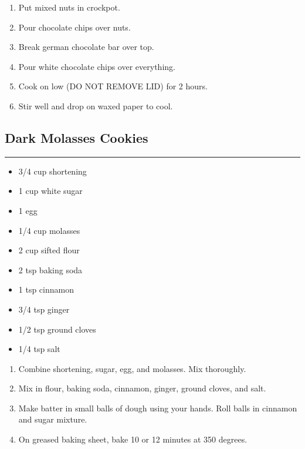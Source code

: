 \documentclass{article}
\begin{document}
\begin{enumerate}
    \item 
        Put mixed nuts in crockpot. 
    \item 
        Pour chocolate chips over nuts.
    \item 
        Break german chocolate bar over top.
    \item 
        Pour white chocolate chips over everything.
    \item 
        Cook on low (DO NOT REMOVE LID) for 2 hours.
    \item 
        Stir well and drop on waxed paper to cool.
\end{enumerate}
\newpage

\subsection{Dark Molasses Cookies} 
\noindent\rule[0.5ex]{\linewidth}{1pt}

\begin{framed}
    \begin{itemize}
        \item 3/4 cup shortening
        \item 1 cup white sugar
        \item 1 egg
        \item 1/4 cup molasses
        \item 2 cup sifted flour
        \item 2 tsp baking soda
        \item 1 tsp cinnamon
        \item 3/4 tsp ginger
        \item 1/2 tsp ground cloves
        \item 1/4 tsp salt
    \end{itemize}
\end{framed}

\begin{enumerate}
    \item 
        Combine shortening, sugar, egg, and molasses. Mix thoroughly.
    \item 
        Mix in flour, baking soda, cinnamon, ginger, ground cloves, and salt.  
    \item 
        Make batter in small balls of dough using your hands. Roll balls in cinnamon and sugar mixture.
    \item 
        On greased baking sheet, bake 10 or 12 minutes at 350 degrees.
\end{enumerate}
\newpage
\end{document}

